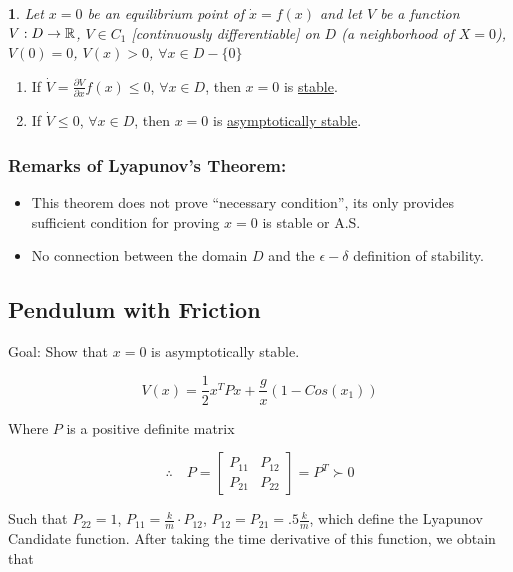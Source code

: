 \newtheorem{theorem}{}

\begin{theorem}
Let $x =0$ be an equilibrium point of $\dot{x} = f(x)$ and let $V$ be a function $V:D \rightarrow \mathbb{R}$, $V \in C_1$ [continuously differentiable] on $D$ (a neighborhood of $X =0$), $V(0) = 0$, $V(x)>0$, $\forall x \in D - \{ 0 \}$
\end{theorem}


\begin{enumerate}
  \item If $\dot{V} = \frac{\partial V}{\partial x}f(x) \leq 0$, $\forall x \in D$, then $x =0$ is \underline{stable}.
  \item If $\dot{V} \leq 0$, $\forall x \in D$, then $x =0$ is \underline{asymptotically stable}.
\end{enumerate}

\subsubsection*{Remarks of Lyapunov's Theorem:}

\begin{itemize}
  \item This theorem does not prove ``necessary condition'', its only provides sufficient condition for proving $x =0 $ is stable or A.S.
  \item No connection between the domain $D$ and the $\epsilon-\delta$ definition of stability.
\end{itemize}

\subsection*{Pendulum with Friction}

Goal: Show that $x =0$ is asymptotically stable.

$$
V(x) = \frac{1}{2} x^TPx + \frac{g}{x}(1 - Cos(x_1))
$$

\noindent Where $P$ is a positive definite matrix

$$
\therefore \quad P =
\begin{bmatrix}
P_{11} & P_{12} \\
P_{21} & P_{22}
\end{bmatrix}  =P^T \succ 0
$$

\noindent Such that $P_{22} = 1$, $P_{11} = \frac{k}{m}\cdot P_{12}$, $P_{12} = P_{21} = .5\frac{k}{m}$, which define the Lyapunov Candidate function. After taking the time derivative of this function, we obtain that

